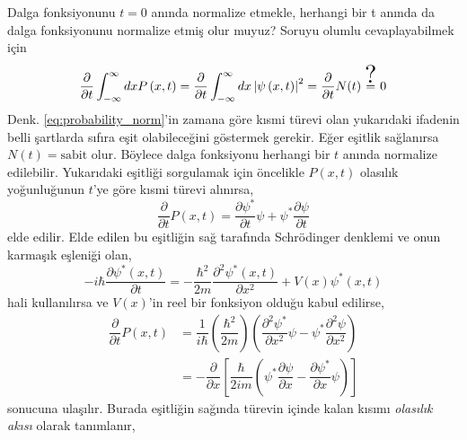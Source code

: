 \documentclass[a4paper,12pt, twoside]{article}
\begin{document}

Dalga fonksiyonunu $t=0$ anında normalize etmekle, herhangi bir t anında da dalga fonksiyonunu normalize etmiş olur muyuz? Soruyu olumlu cevaplayabilmek için 
\begin{equation}
\dfrac {\partial }{\partial t} \int ^{\infty }_{-\infty }dxP\left( x,t\right) = \dfrac {\partial }{\partial t} \int ^{\infty }_{-\infty }dx\left| \psi \left( x,t\right) \right| ^{2}= \dfrac {\partial }{\partial t}N(t) \stackrel{\scalebox{2}{?}}{=} 0 
\label{eq:probability_norm_derivative}
\end{equation}
Denk. \ref{eq:probability_norm}'in zamana göre kısmi türevi olan yukarıdaki ifadenin belli şartlarda sıfıra eşit olabileceğini göstermek gerekir. Eğer eşitlik sağlanırsa $N(t) = \text{sabit}$ olur. Böylece dalga fonksiyonu herhangi bir $t$ anında normalize edilebilir. Yukarıdaki eşitliği sorgulamak için öncelikle $P(x,t)$ olasılık yoğunluğunun $t$'ye göre kısmi türevi alınırsa,
\begin{equation}
\dfrac {\partial }{\partial t}P\left( x,t\right) = \dfrac {\partial \psi ^{\ast }}{\partial t}\psi +\psi ^{\ast }\dfrac {\partial \psi }{\partial t}
\label{eq:probability_derivative_t}
\end{equation}
elde edilir. Elde edilen bu eşitliğin sağ tarafında Schrödinger denklemi ve onun karmaşık eşleniği olan,
\begin{equation}
-i\hbar \dfrac {\partial \psi ^{\ast }\left( x,t\right) }{\partial t}=-\dfrac {\hbar ^{2}}{2m}\dfrac {\partial ^{2}\psi ^{\ast }\left( x,t\right) }{\partial x^{2}}+V\left( x\right) \psi ^{\ast }\left( x,t\right)
\label{eq:schrodinger_conjugate}
\end{equation}
hali kullanılırsa ve $V(x)$'in reel bir fonksiyon olduğu kabul edilirse,
\begin{align}
\dfrac {\partial }{\partial t}P\left( x,t\right) &=\dfrac {1}{i\hbar }\left( \dfrac {\hbar ^{2}}{2m}\right) \left( \dfrac {\partial ^{2}\psi ^{\ast }}{\partial x^{2}}\psi -\psi ^{\ast }\dfrac {\partial ^{2}\psi }{\partial x^{2}}\right) \\
&=-\dfrac {\partial }{\partial x}\left[ \dfrac {\hbar }{2im}\left( \psi ^{\ast }\dfrac {\partial \psi }{\partial x}-\dfrac {\partial \psi ^{\ast }}{\partial x}\psi \right) \right]
\end{align}
sonucuna ulaşılır. Burada eşitliğin sağında türevin içinde kalan kısımı \emph{olasılık akısı} olarak tanımlanır,
\end{document}
